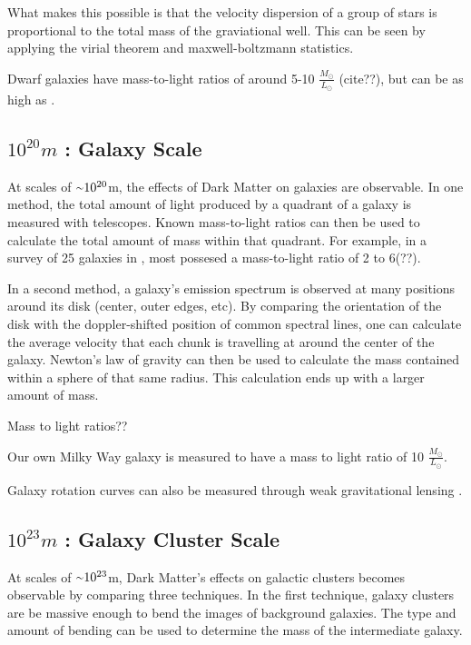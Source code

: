     What makes this possible is that the velocity dispersion of a group of stars is proportional to the total mass of the graviational well.
    This can be seen by applying the virial theorem and maxwell-boltzmann statistics.

    Dwarf galaxies have mass-to-light ratios of around 5-10 $\frac{M_\odot}{L_\odot}$ (cite??), but can be as high as  \cite{Simon2007_dwarfgalaxykeck}.

  \subsection{$10^{20}m$ : Galaxy Scale}
    At scales of $\nicetilde 10^{20}$m, the effects of Dark Matter on galaxies are observable.
    In one method, the total amount of light produced by a quadrant of a galaxy is measured with telescopes.
    Known mass-to-light ratios can then be used to calculate the total amount of mass within that quadrant.
    For example, in a survey of 25 galaxies in \cite{galaxy_mass_light_ratio}, most possesed a mass-to-light ratio of 2 to 6(??).


    In a second method, a galaxy's emission spectrum is observed at many positions around its disk (center, outer edges, etc).
    By comparing the orientation of the disk with the doppler-shifted position of common spectral lines, one can calculate the average velocity that each chunk is travelling at around the center of the galaxy.
    Newton's law of gravity can then be used to calculate the mass contained within a sphere of that same radius.
    This calculation ends up with a larger amount of mass.

    Mass to light ratios??

    Our own Milky Way galaxy is measured to have a mass to light ratio of 10 $\frac{M_{\odot}}{L_{\odot}}$.

    Galaxy rotation curves can also be measured through weak gravitational lensing \cite{weak_lensing_2001}.

  \subsection{$10^{23}m$ : Galaxy Cluster Scale}
    At scales of $\nicetilde 10^{23}$m, Dark Matter's effects on galactic clusters becomes observable by comparing three techniques.
    In the first technique, galaxy clusters are be massive enough to bend the images of background galaxies.
    The type and amount of bending can be used to determine the mass of the intermediate galaxy.

